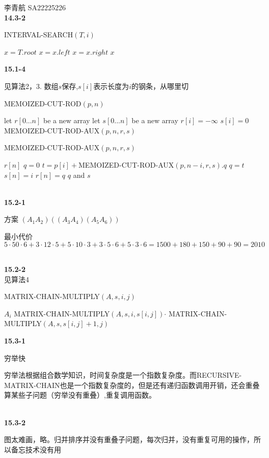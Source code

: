 \documentclass[UTF8]{ctexart}
\begin{document}
李青航 SA22225226\\

\noindent\textbf{14.3-2}

\begin{algorithm}
	\caption {INTERVAL-SEARCH$(T,i)$}
	\label{alg:1}
	\begin{algorithmic}[1]
		\STATE $x=T.root$
				\STATE $x=x.left$
			\ELSE
				\STATE $x=x.right$
			\ENDIF
		\ENDWHILE
		\RETURN $x$
		
	\end{algorithmic}
\end{algorithm}

\noindent\textbf{15.1-4}

见算法2，3. 
数组$s$保存,$s[i]$表示长度为$i$的钢条，从哪里切
\begin{algorithm}
	\caption {MEMOIZED-CUT-ROD$(p,n)$}
	\label{alg:2}
	\begin{algorithmic}[1]
		\STATE let $r[0...n]$ be a new array
		\STATE let $s[0...n]$ be a new array
			\STATE $r[i]=-\infty$
			\STATE $s[i]=0$
		\ENDFOR
		\RETURN MEMOIZED-CUT-ROD-AUX$(p,n,r,s)$
	\end{algorithmic}
\end{algorithm}
\begin{algorithm}
	\caption {MEMOIZED-CUT-ROD-AUX$(p,n,r,s)$}
	\label{alg:3}
	\begin{algorithmic}[1]
			\RETURN $r[n]$
		\ENDIF
			\STATE $q=0$
				\STATE $t=p[i]+$MEMOIZED-CUT-ROD-AUX$(p,n-i,r,s).q$
					\STATE $q=t$
					\STATE $s[n]=i$
				\ENDIF
			\ENDFOR
		\ENDIF
		\STATE $r[n]=q$
		\RETURN $q$ and $s$
	\end{algorithmic}
\end{algorithm}

~\\
\noindent\textbf{15.2-1}

方案 $(A_1A_2)((A_3A_4)(A_5A_6))$

最小代价$ 5 \cdot 50 \cdot 6 + 3 \cdot 12 \cdot 5 + 5 \cdot 10 \cdot 3 + 3 \cdot 5 \cdot 6 + 5 \cdot 3 \cdot 6 =
1500 + 180 + 150 + 90 + 90 = 2010$

~\\
\noindent\textbf{15.2-2}\\
见算法4
\begin{algorithm}
	\caption {MATRIX-CHAIN-MULTIPLY$(A,s,i,j)$}
	\label{alg:4}
	\begin{algorithmic}[1]
			\RETURN $A_i$
		\ENDIF
		\RETURN MATRIX-CHAIN-MULTIPLY$(A,s,i,s[i,j])$$\cdot$ MATRIX-CHAIN-MULTIPLY$(A,s,s[i,j]+1,j)$
	\end{algorithmic}
\end{algorithm}

\noindent\textbf{15.3-1}

穷举快

穷举法根据组合数学知识，时间复杂度是一个指数复杂度。而RECURSIVE-MATRIX-CHAIN也是一个指数复杂度的，但是还有递归函数调用开销，还会重叠算某些子问题（穷举没有重叠）,重复调用函数。

~\\
\noindent\textbf{15.3-2}

图太难画，略。归并排序并没有重叠子问题，每次归并，没有重复可用的操作，所以备忘技术没有用
\end{document}
